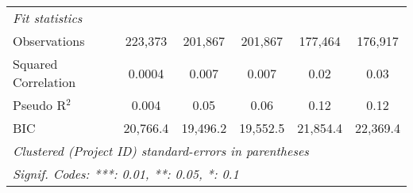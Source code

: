 \documentclass[
]{article}
\begin{document}
\begin{table}[htbp]
\begin{tabular}{lccccc}
      \midrule
      \emph{Fit statistics}\\
      Observations                 & 223,373       & 201,867        & 201,867       & 177,464       & 176,917\\  
      Squared Correlation          & 0.0004        & 0.007          & 0.007         & 0.02          & 0.03\\  
      Pseudo R$^2$                 & 0.004         & 0.05           & 0.06          & 0.12          & 0.12\\  
      BIC                          & 20,766.4      & 19,496.2       & 19,552.5      & 21,854.4      & 22,369.4\\  
      \midrule \midrule
      \multicolumn{6}{l}{\emph{Clustered (Project ID) standard-errors in parentheses}}\\
      \multicolumn{6}{l}{\emph{Signif. Codes: ***: 0.01, **: 0.05, *: 0.1}}\\
   \end{tabular}
\end{table}
\end{document}
